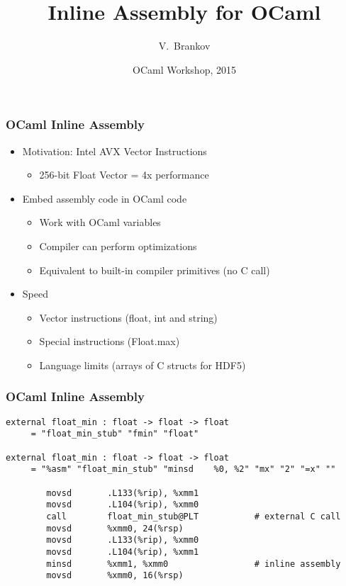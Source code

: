 \documentclass{beamer}
\title[Inline Assembly]
{Inline Assembly for OCaml}
\author[Brankov, Vladimir]{V.~Brankov\inst{1}}
\institute[Jane Street]
{
  \inst{1}
  Jane Street
}
\date[August 2015]
{OCaml Workshop, 2015}
\begin{document}
\begin{frame}
  \frametitle{OCaml Inline Assembly}
  \begin{itemize}
    \item Motivation: Intel AVX Vector Instructions
      \begin{itemize}
        \item 256-bit Float Vector = 4x performance
      \end{itemize}
      \bigskip
    \item Embed assembly code in OCaml code
      \begin{itemize}
        \item Work with OCaml variables
        \item Compiler can perform optimizations
        \item Equivalent to built-in compiler primitives (no C call)
      \end{itemize}
      \bigskip
    \item Speed
      \begin{itemize}
        \item Vector instructions (float, int and string)
        \item Special instructions (Float.max)
        \item Language limits (arrays of C structs for HDF5)
      \end{itemize}
  \end{itemize}
\end{frame}
\begin{frame}[fragile]
  \frametitle{OCaml Inline Assembly}
  \begin{lstlisting}
external float_min : float -> float -> float
     = "float_min_stub" "fmin" "float"

external float_min : float -> float -> float
     = "%asm" "float_min_stub" "minsd    %0, %2" "mx" "2" "=x" ""

        movsd       .L133(%rip), %xmm1
        movsd       .L104(%rip), %xmm0
        call        float_min_stub@PLT           # external C call
        movsd       %xmm0, 24(%rsp)
        movsd       .L133(%rip), %xmm0
        movsd       .L104(%rip), %xmm1
        minsd       %xmm1, %xmm0                 # inline assembly
        movsd       %xmm0, 16(%rsp)
  \end{lstlisting}
\end{frame}
\end{document}
